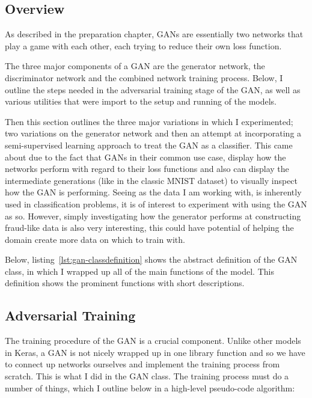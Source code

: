 \documentclass[12pt,a4paper,twoside]{report}
\begin{document}
\subsection{Overview}
As described in the preparation chapter, GANs are essentially two networks that play a game with each other, each trying to reduce their own loss function. 

The three major components of a GAN are the generator network, the discriminator network and the combined network training process. Below, I outline the steps needed in the adversarial training stage of the GAN, as well as various utilities that were import to the setup and running of the models. 

Then this section outlines the three major variations in which I experimented; two variations on the generator network and then an attempt at incorporating a semi-supervised learning approach to treat the GAN as a classifier. This came about due to the fact that GANs in their common use case, display how the networks perform with regard to their loss functions and also can display the intermediate generations (like in the classic MNIST dataset) to visually inspect how the GAN is performing. Seeing as the data I am working with, is inherently used in classification problems, it is of interest to experiment with using the GAN as so. However, simply investigating how the generator performs at constructing fraud-like data is also very interesting, this could have potential of helping the domain create more data on which to train with. 

Below, listing~\ref{lst:gan-classdefinition} shows the abstract definition of the GAN class, in which I wrapped up all of the main functions of the model. This definition shows the prominent functions with short descriptions. 


\subsection{Adversarial Training}

The training procedure of the GAN is a crucial component. Unlike other models in Keras, a GAN is not nicely wrapped up in one library function and so we have to connect up networks ourselves and implement the training process from scratch. This is what I did in the GAN class. The training process must do a number of things, which I outline below in a high-level pseudo-code algorithm:
\end{document}
